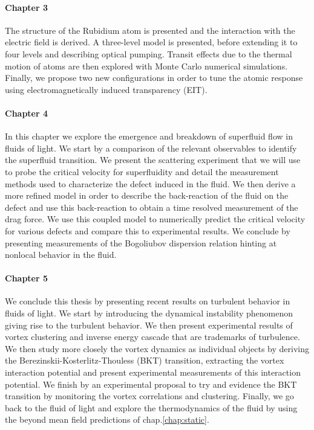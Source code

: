 \paragraph*{Chapter 3}

The structure of the Rubidium atom is presented and the interaction with the electric field is derived.
A three-level model is presented, before extending it to four levels and describing optical pumping.
Transit effects due to the thermal motion of atoms are then explored with Monte Carlo numerical 
simulations.
Finally, we propose two new configurations in order to tune the atomic response using electromagnetically 
induced transparency (EIT).

\paragraph*{Chapter 4}

In this chapter we explore the emergence and breakdown of superfluid flow in fluids of light.
We start by a comparison of the relevant observables to identify the superfluid transition.
We present the scattering experiment that we will use to probe the critical velocity for 
superfluidity and detail the measurement methods used to characterize the defect induced in 
the fluid.
We then derive a more refined model in order to describe the back-reaction of the fluid 
on the defect and use this back-reaction to obtain a time resolved measurement of the drag force.
We use this coupled model to numerically predict the critical velocity for various defects 
and compare this to experimental results.
We conclude by presenting measurements of the Bogoliubov dispersion relation hinting at 
nonlocal behavior in the fluid.

\paragraph*{Chapter 5}

We conclude this thesis by presenting recent results on turbulent behavior in fluids of light.
We start by introducing the dynamical instability phenomenon giving rise to the turbulent 
behavior.
We then present experimental results of vortex clustering and inverse energy cascade that
are trademarks of turbulence.
We then study more closely the vortex dynamics as individual objects by deriving the 
Berezinskii-Kosterlitz-Thouless (BKT) transition, extracting the vortex interaction 
potential and present experimental measurements of this interaction potential.
We finish by an experimental proposal to try and evidence the BKT transition by monitoring the
vortex correlations and clustering.
Finally, we go back to the fluid of light and explore the thermodynamics of the fluid
by using the beyond mean field predictions of chap.\ref{chap:static}.